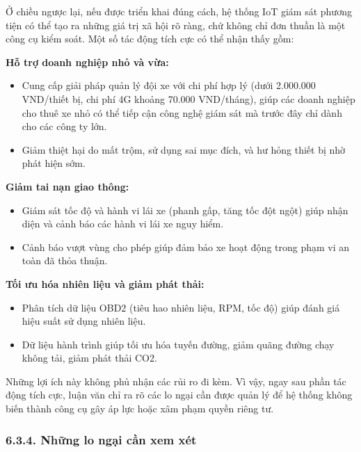 \documentclass[a4paper]{extarticle}
\providecommand{\tightlist}{%
  \setlength{\itemsep}{0pt}\setlength{\parskip}{0pt}}
\begin{document}
Ở chiều ngược lại, nếu được triển khai đúng cách, hệ thống IoT giám sát
phương tiện có thể tạo ra những giá trị xã hội rõ ràng, chứ không chỉ
đơn thuần là một công cụ kiểm soát. Một số tác động tích cực có thể nhận
thấy gồm:

\textbf{Hỗ trợ doanh nghiệp nhỏ và vừa:}

\begin{itemize}
\tightlist
\item
  Cung cấp giải pháp quản lý đội xe với chi phí hợp lý (dưới 2.000.000
  VND/thiết bị, chi phí 4G khoảng 70.000 VND/tháng), giúp các doanh
  nghiệp cho thuê xe nhỏ có thể tiếp cận công nghệ giám sát mà trước đây
  chỉ dành cho các công ty lớn.
\item
  Giảm thiệt hại do mất trộm, sử dụng sai mục đích, và hư hỏng thiết bị
  nhờ phát hiện sớm.
\end{itemize}

\textbf{Giảm tai nạn giao thông:}

\begin{itemize}
\tightlist
\item
  Giám sát tốc độ và hành vi lái xe (phanh gấp, tăng tốc đột ngột) giúp
  nhận diện và cảnh báo các hành vi lái xe nguy hiểm.
\item
  Cảnh báo vượt vùng cho phép giúp đảm bảo xe hoạt động trong phạm vi an toàn đã
  thỏa thuận.
\end{itemize}

\textbf{Tối ưu hóa nhiên liệu và giảm phát thải:}

\begin{itemize}
\tightlist
\item
  Phân tích dữ liệu OBD2 (tiêu hao nhiên liệu, RPM, tốc độ) giúp đánh
  giá hiệu suất sử dụng nhiên liệu.
\item
  Dữ liệu hành trình giúp tối ưu hóa tuyến đường, giảm quãng đường chạy
  không tải, giảm phát thải CO2.
\end{itemize}

Những lợi ích này không phủ nhận các rủi ro đi kèm. Vì vậy, ngay sau
phần tác động tích cực, luận văn chỉ ra rõ các lo ngại cần được quản lý
để hệ thống không biến thành công cụ gây áp lực hoặc xâm phạm quyền
riêng tư.

\subsubsection{6.3.4. Những lo ngại cần xem
xét}\label{634-nhux1eefng-lo-ngux1ea1i-cux1ea7n-xem-xuxe9t}
\end{document}
